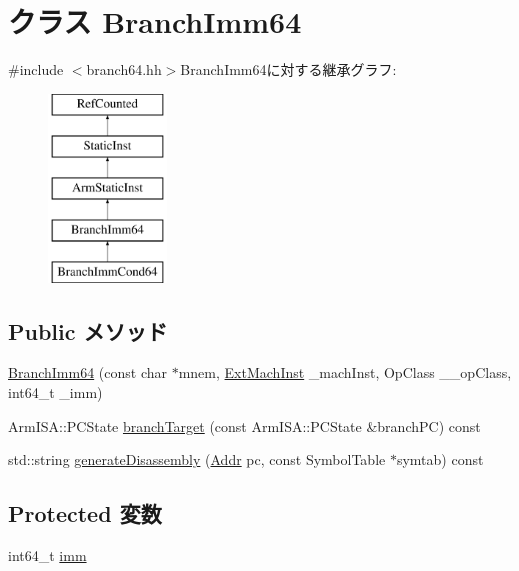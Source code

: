 \hypertarget{classArmISA_1_1BranchImm64}{
\section{クラス BranchImm64}
\label{classArmISA_1_1BranchImm64}
}


{\ttfamily \#include $<$branch64.hh$>$}BranchImm64に対する継承グラフ:\begin{figure}[H]
\begin{center}
\leavevmode
\includegraphics[height=5cm]{classArmISA_1_1BranchImm64}
\end{center}
\end{figure}
\subsection*{Public メソッド}
\begin{DoxyCompactItemize}
\item 
\hyperlink{classArmISA_1_1BranchImm64_a5c757855b245901a85aa1fe1fa370d3f}{BranchImm64} (const char $\ast$mnem, \hyperlink{classStaticInst_a5605d4fc727eae9e595325c90c0ec108}{ExtMachInst} \_\-machInst, OpClass \_\-\_\-opClass, int64\_\-t \_\-imm)
\item 
ArmISA::PCState \hyperlink{classArmISA_1_1BranchImm64_aef1dd7539a8d8c49730120f2c0b8088e}{branchTarget} (const ArmISA::PCState \&branchPC) const 
\item 
std::string \hyperlink{classArmISA_1_1BranchImm64_a95d323a22a5f07e14d6b4c9385a91896}{generateDisassembly} (\hyperlink{classm5_1_1params_1_1Addr}{Addr} pc, const SymbolTable $\ast$symtab) const 
\end{DoxyCompactItemize}
\subsection*{Protected 変数}
\begin{DoxyCompactItemize}
\item 
int64\_\-t \hyperlink{classArmISA_1_1BranchImm64_a11b34c3ceec32cc1f14d0ca9c099c470}{imm}
\end{DoxyCompactItemize}


